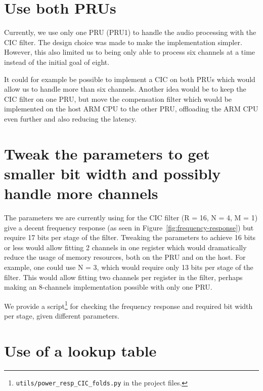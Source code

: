 \documentclass[]{report}
\begin{document}
\hypertarget{use-both-prus}{%
\section{Use both PRUs}\label{use-both-prus}}

Currently, we use only one PRU (PRU1) to handle the audio processing with the CIC filter. The design choice was made to make the implementation simpler. However, this also limited us to being only able to process six channels at a time instead of the initial goal of eight.

It could for example be possible to implement a CIC on both PRUs which would allow us to handle more than six channels. Another idea would be to keep the CIC filter on one PRU, but move the compensation filter which would be implemented on the host ARM CPU to the other PRU, offloading the ARM CPU even further and also reducing the latency.

\hypertarget{tweak-the-parameters-to-get-smaller-bit-width-and-possibly-handle-more-channels}{%
\section{Tweak the parameters to get smaller bit width and possibly
handle more
channels}\label{tweak-the-parameters-to-get-smaller-bit-width-and-possibly-handle-more-channels}}

The parameters we are currently using for the CIC filter (R = 16, N = 4, M = 1) give a decent frequency response (as seen in Figure~\ref{fig:frequency-response}) but require 17 bits per stage of the filter. Tweaking the parameters to achieve 16 bits or less would allow fitting 2 channels in one register which would dramatically reduce the usage of memory resources, both on the PRU and on the host. For example, one could use N = 3, which would require only 13 bits per stage of the filter. This would allow fitting two channels per register in the filter, perhaps making an 8-channels implementation possible with only one PRU.

We provide a script\footnote{\texttt{utils/power\_resp\_CIC\_folds.py} in the project files.} for checking the frequency response and required bit width per stage, given different parameters.

\hypertarget{use-of-a-lookup-table}{%
\section{Use of a lookup table}\label{use-of-a-lookup-table}}
\end{document}
